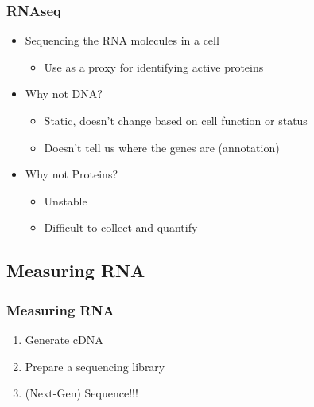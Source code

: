 \documentclass[14pt]{beamer}
\begin{document}
\begin{frame}
\frametitle{RNAseq}
	\begin{itemize}
		\item<+-> Sequencing the RNA molecules in a cell
		\begin{itemize}
			\item<+-> Use as a proxy for identifying active proteins
		\end{itemize}
		\item<+-> Why not DNA?
		\begin{itemize}
			\item<+-> Static, doesn't change based on cell function or status
			\item<+-> Doesn't tell us where the genes are (annotation)
		\end{itemize}
		\item<+-> Why not Proteins?
		\begin{itemize}
			\item<+-> Unstable
			\item<+-> Difficult to collect and quantify
		\end{itemize}
	\end{itemize}
\end{frame}

\subsection{Measuring RNA}

\begin{frame}
\frametitle{Measuring RNA}
	\begin{enumerate}
		\item<+-> Generate cDNA
		\item<+-> Prepare a sequencing library
		\item<+-> (Next-Gen) Sequence!!!
	\end{enumerate}
\end{frame}
\end{document}
